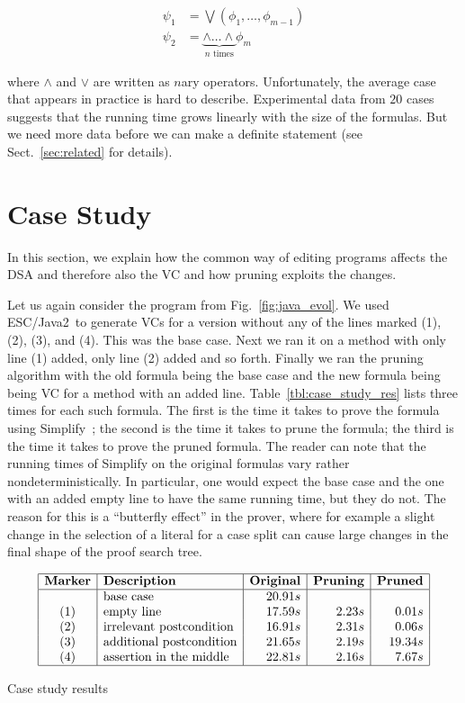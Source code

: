 \documentclass{llncs}
\def\escjava{\hskip 0pt\hbox{ESC/Java2}}
\begin{document}
\begin{align}
\psi_1 &= \bigvee(\phi_1,\ldots,\phi_{m-1}) \\
\psi_2 &= \underbrace{\land\ldots\land}_{n\text{ times}} \phi_m
\end{align}

\noindent
where $\land$ and $\lor$ are written as $n$ary operators.
Unfortunately, the average case that
appears in practice is hard to describe. Experimental data
from $20$ cases suggests that the running time grows linearly
with the size of the formulas. But we need more data before 
we can make a definite statement 
(see Sect.~\ref{sec:related} for details).

\section{Case Study}

In this section, we explain how the common way of editing programs
affects the DSA and therefore also the VC and how pruning exploits
the changes.

Let us again consider the program from Fig.~\ref{fig:java_evol}.
We used \escjava\ to generate VCs for a version without any of the 
lines marked (1), (2), (3), and (4). This was the base case. Next 
we ran it on a method with only line (1) added, only line (2) added 
and so forth. Finally
we ran the pruning algorithm with the old formula being the base
case and the new formula being being VC for a method with an added line.
Table~\ref{tbl:case_study_res} lists three times for each such
formula. The first is the time it takes to prove the formula
using Simplify~\cite{simplify}; the second is the time it takes
to prune the formula; the third is the time it takes to prove
the pruned formula. The reader can note that the running times of 
Simplify on the original formulas vary rather nondeterministically.
In particular, one would expect the base case and the one with
an added empty line to have the same running time, but they do not.
The reason for this is a ``butterfly effect'' in the prover, where for
example a slight change in the selection of a literal for a case split
can cause large changes in the final shape of the proof search tree.

\begin{table}
\centering
\[
\begin{array}{|c|l|r|r|r|r|r|}
\hline
\mbox{\bf Marker} &
\mbox{\bf Description} &
\mbox{\bf Original} &
\mbox{\bf Pruning} &
\mbox{\bf Pruned}
\\
\hline
& \mbox{base case} &     		    20.91s &   &   \\  
(1) & \mbox{empty line} 	 	    & 17.59s  & 2.23s & 0.01s   \\
(2) & \mbox{irrelevant postcondition} & 16.91s & 2.31s & 0.06s  \\
(3) & \mbox{additional postcondition} & 21.65s & 2.19s & 19.34s \\
(4) & \mbox{assertion in the middle}  & 22.81s & 2.16s & 7.67s  \\
\hline
\end{array}
\]
  \caption{Case study results}
  \label{tbl:case_study_res}
\end{table}
\end{document}
